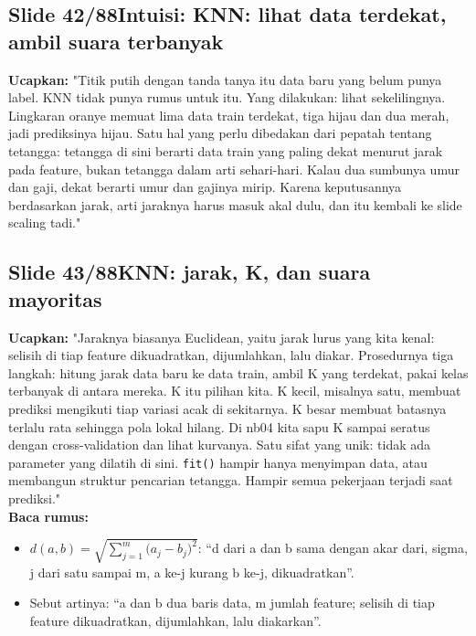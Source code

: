 \documentclass[11pt]{article}
\renewcommand{\framebox}[1]{\colorbox{acc!15}{\textcolor{acc}{\textbf{#1}}}}
\begin{document}
\subsection*{\framebox{Slide 42/88}\quad Intuisi: KNN: lihat data terdekat, ambil suara terbanyak}
\textbf{Ucapkan:} "Titik putih dengan tanda tanya itu data baru yang belum punya label. KNN tidak punya rumus untuk itu. Yang dilakukan: lihat sekelilingnya. Lingkaran oranye memuat lima data train terdekat, tiga hijau dan dua merah, jadi prediksinya hijau. Satu hal yang perlu dibedakan dari pepatah tentang tetangga: tetangga di sini berarti data train yang paling dekat menurut jarak pada feature, bukan tetangga dalam arti sehari-hari. Kalau dua sumbunya umur dan gaji, dekat berarti umur dan gajinya mirip. Karena keputusannya berdasarkan jarak, arti jaraknya harus masuk akal dulu, dan itu kembali ke slide scaling tadi."\\[2pt]

\subsection*{\framebox{Slide 43/88}\quad KNN: jarak, K, dan suara mayoritas}
\textbf{Ucapkan:} "Jaraknya biasanya Euclidean, yaitu jarak lurus yang kita kenal: selisih di tiap feature dikuadratkan, dijumlahkan, lalu diakar. Prosedurnya tiga langkah: hitung jarak data baru ke data train, ambil K yang terdekat, pakai kelas terbanyak di antara mereka. K itu pilihan kita. K kecil, misalnya satu, membuat prediksi mengikuti tiap variasi acak di sekitarnya. K besar membuat batasnya terlalu rata sehingga pola lokal hilang. Di nb04 kita sapu K sampai seratus dengan cross-validation dan lihat kurvanya. Satu sifat yang unik: tidak ada parameter yang dilatih di sini. \texttt{fit()} hampir hanya menyimpan data, atau membangun struktur pencarian tetangga. Hampir semua pekerjaan terjadi saat prediksi."\\[2pt]
\textbf{Baca rumus:}\\[2pt]
\begin{itemize}\setlength\itemsep{0.2em}
\item $d(a,b) = \sqrt{\sum_{j=1}^{m}\bigl(a_j - b_j\bigr)^2}$: ``d dari a dan b sama dengan akar dari, sigma, j dari satu sampai m, a ke-j kurang b ke-j, dikuadratkan''.
\item Sebut artinya: ``a dan b dua baris data, m jumlah feature; selisih di tiap feature dikuadratkan, dijumlahkan, lalu diakarkan''.
\end{itemize}
\end{document}
